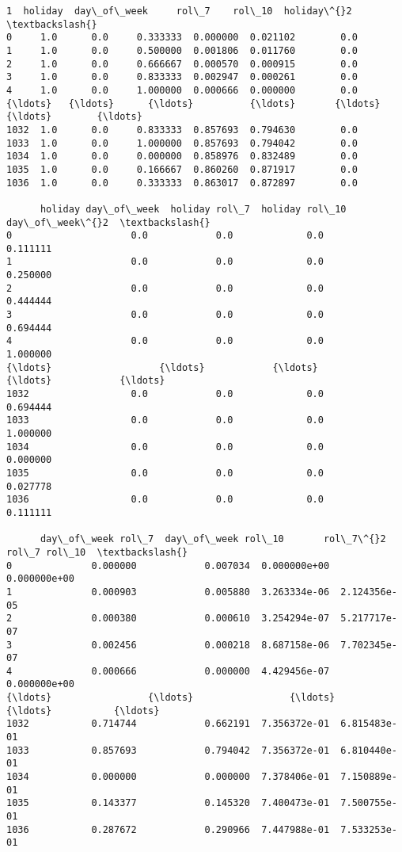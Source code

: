 \documentclass[11pt]{article}
\makeatletter
\newcommand{\boxspacing}{\kern\kvtcb@left@rule\kern\kvtcb@boxsep}
\newcommand{\prompt}[4]{
        {\ttfamily\llap{{\color{#2}[#3]:\hspace{3pt}#4}}\vspace{-\baselineskip}}
    }
\makeatother
\begin{document}
            \begin{tcolorbox}[breakable, size=fbox, boxrule=.5pt, pad at break*=1mm, opacityfill=0]
\prompt{Out}{outcolor}{147}{\boxspacing}
\begin{Verbatim}[commandchars=\\\{\}]
        1  holiday  day\_of\_week     rol\_7    rol\_10  holiday\^{}2  \textbackslash{}
0     1.0      0.0     0.333333  0.000000  0.021102        0.0
1     1.0      0.0     0.500000  0.001806  0.011760        0.0
2     1.0      0.0     0.666667  0.000570  0.000915        0.0
3     1.0      0.0     0.833333  0.002947  0.000261        0.0
4     1.0      0.0     1.000000  0.000666  0.000000        0.0
{\ldots}   {\ldots}      {\ldots}          {\ldots}       {\ldots}       {\ldots}        {\ldots}
1032  1.0      0.0     0.833333  0.857693  0.794630        0.0
1033  1.0      0.0     1.000000  0.857693  0.794042        0.0
1034  1.0      0.0     0.000000  0.858976  0.832489        0.0
1035  1.0      0.0     0.166667  0.860260  0.871917        0.0
1036  1.0      0.0     0.333333  0.863017  0.872897        0.0

      holiday day\_of\_week  holiday rol\_7  holiday rol\_10  day\_of\_week\^{}2  \textbackslash{}
0                     0.0            0.0             0.0       0.111111
1                     0.0            0.0             0.0       0.250000
2                     0.0            0.0             0.0       0.444444
3                     0.0            0.0             0.0       0.694444
4                     0.0            0.0             0.0       1.000000
{\ldots}                   {\ldots}            {\ldots}             {\ldots}            {\ldots}
1032                  0.0            0.0             0.0       0.694444
1033                  0.0            0.0             0.0       1.000000
1034                  0.0            0.0             0.0       0.000000
1035                  0.0            0.0             0.0       0.027778
1036                  0.0            0.0             0.0       0.111111

      day\_of\_week rol\_7  day\_of\_week rol\_10       rol\_7\^{}2  rol\_7 rol\_10  \textbackslash{}
0              0.000000            0.007034  0.000000e+00  0.000000e+00
1              0.000903            0.005880  3.263334e-06  2.124356e-05
2              0.000380            0.000610  3.254294e-07  5.217717e-07
3              0.002456            0.000218  8.687158e-06  7.702345e-07
4              0.000666            0.000000  4.429456e-07  0.000000e+00
{\ldots}                 {\ldots}                 {\ldots}           {\ldots}           {\ldots}
1032           0.714744            0.662191  7.356372e-01  6.815483e-01
1033           0.857693            0.794042  7.356372e-01  6.810440e-01
1034           0.000000            0.000000  7.378406e-01  7.150889e-01
1035           0.143377            0.145320  7.400473e-01  7.500755e-01
1036           0.287672            0.290966  7.447988e-01  7.533253e-01


\end{Verbatim}
\end{tcolorbox}
\end{document}
